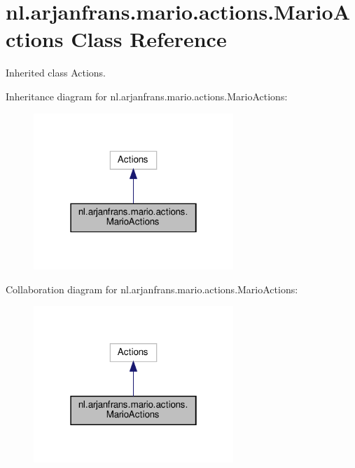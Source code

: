 \hypertarget{classnl_1_1arjanfrans_1_1mario_1_1actions_1_1MarioActions}{}\section{nl.\+arjanfrans.\+mario.\+actions.\+Mario\+Actions Class Reference}
\label{classnl_1_1arjanfrans_1_1mario_1_1actions_1_1MarioActions}


Inherited class Actions.  




Inheritance diagram for nl.\+arjanfrans.\+mario.\+actions.\+Mario\+Actions\+:\nopagebreak
\begin{figure}[H]
\begin{center}
\leavevmode
\includegraphics[width=214pt]{classnl_1_1arjanfrans_1_1mario_1_1actions_1_1MarioActions__inherit__graph}
\end{center}
\end{figure}


Collaboration diagram for nl.\+arjanfrans.\+mario.\+actions.\+Mario\+Actions\+:\nopagebreak
\begin{figure}[H]
\begin{center}
\leavevmode
\includegraphics[width=214pt]{classnl_1_1arjanfrans_1_1mario_1_1actions_1_1MarioActions__coll__graph}
\end{center}
\end{figure}
